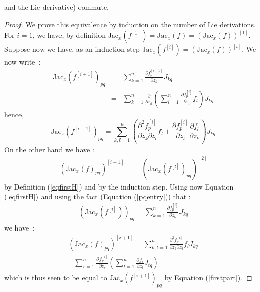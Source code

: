 \documentclass{sig-alternate-05-2015} %
\begin{document}
and the Lie derivative) commute.  
\begin{proof}
We prove this equivalence by induction on the number of Lie derivations. 
For $i=1$, we have, by definition $\mbox{Jac}_x(f^{[1]})
=\mbox{Jac}_x(f)=(\mbox{Jac}_x(f))^{[1]}$. Suppose now we have, as an induction
step $\mbox{Jac}_x(f^{[i]})=(\mbox{Jac}_x(f))^{[i]}$. We now write~:
$$\begin{array}{rcl}
\mbox{Jac}_x(f^{[i+1]})_{pq} & = & \sum\limits_{k=1}^n \frac{\partial f^{[i+1]}_p}{\partial z_k} J_{kq} \\
 & = & \sum\limits_{k=1}^n \frac{\partial}{\partial z_k} \left(
\sum\limits_{l=1}^n \frac{\partial{f^{[i]}_p}}{\partial z_l} f_l
\right)J_{kq}
\end{array}$$
\noindent hence, 
\begin{equation}
\mbox{Jac}_x(f^{[i+1]})_{pq} =  \sum\limits_{k,l=1}^n \left(\frac{\partial^2 f_p^{[i]}}{\partial z_k \partial z_l} f_l
+\frac{\partial f_p^{[i]}}{\partial z_l}\frac{\partial f_l}{\partial z_k}\right)
J_{kq}
\label{firstpart}
\end{equation}
On the other hand we have : 
$$\begin{array}{rcl}
(\mbox{Jac}_x(f)_{pq})^{[i+1]} & = &
(\mbox{Jac}_x(f^{[i]})_{pq})^{[2]}
\end{array}$$
\noindent by Definition (\ref{eqfirstH}) and by the induction step. 
Using now Equation (\ref{eqfirstH}) and using the fact (Equation (\ref{pqentry})) that :
$$\begin{array}{rcl}
(\mbox{Jac}_x(f^{[i]}))_{pq} = \sum\limits_{k=1}^n \frac{\partial f^{[i]}_p}{\partial z_k} J_{kq}
\end{array}$$
\noindent we have~:  
\begin{multline}
(\mbox{Jac}_x(f)_{pq})^{[i+1]}  = 
\sum\limits_{k,l=1}^n \frac{\partial^2 f_p^{[i]}}{\partial z_k \partial z_l} f_l J_{kq} \\
+ \sum\limits_{r=1}^n \frac{\partial f_p^{[i]}}{\partial z_r}\left(\sum\limits_{t=1}^n
\frac{\partial f_r}{\partial z_t} J_{tq} \right)
\end{multline}
\noindent which is thus seen to be equal to $\mbox{Jac}_x(f^{[i+1]})_{pq}$ by
Equation (\ref{firstpart}). 
\end{proof}
\end{document}
